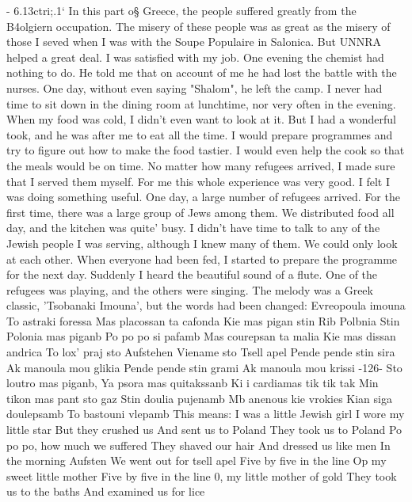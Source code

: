
- 6.13ctri;.1‘ 
In this part o§ Greece, the people suffered greatly from the B4olgiern occupation. 
The misery of these people was as great as the misery of those I seved when I was with 
the Soupe Populaire in Salonica. But UNNRA helped a great deal. I was satisfied with 
my job. 
One evening the chemist had nothing to do. He told me that on account of me 
he had lost the battle with the nurses. One day, without even saying "Shalom", he 
left the camp. 
I never had time to sit down in the dining room at lunchtime, nor very often in 
the evening. When my food was cold, I didn't even want to look at it. But I had a 
wonderful took, and he was after me to eat all the time. I would prepare programmes 
and try to figure out how to make the food tastier. I would even help the cook so 
that the meals would be on time. No matter how many refugees arrived, I made sure 
that I served them myself. For me this whole experience was very good. I felt I 
was doing something useful. 
One day, a large number of refugees arrived. For the first time, there was a 
large group of Jews among them. We distributed food all day, and the kitchen was quite' 
busy. I didn't have time to talk to any of the Jewish people I was serving, although 
I knew many of them. We could only look at each other. When everyone had been fed, 
I started to prepare the programme for the next day. Suddenly I heard the beautiful 
sound of a flute. One of the refugees was playing, and the others were singing. The 
melody was a Greek classic, 'Tsobanaki Imouna', but the words had been changed: 
Evreopoula imouna 
To astraki foressa 
Mas placossan ta cafonda 
Kie mas pigan stin Rib Polbnia 
Stin Polonia mas piganb 
Po po po si pafamb 
Mas courepsan ta malia 
Kie mas dissan andrica 
To lox' praj sto Aufstehen 
Viename sto Tsell apel 
Pende pende stin sira 
Ak manoula mou glikia 
Pende pende stin grami 
Ak manoula mou krissi 
-126- 
Sto loutro mas piganb, 
Ya psora mas quitakssanb 
Ki i cardiamas tik tik tak 
Min tikon mas pant sto gaz 
Stin doulia pujenamb 
Mb anenous kie vrokies 
Kian siga doulepsamb 
To bastouni vlepamb 
This means: 
I was a little Jewish girl 
I wore my little star 
But they crushed us 
And sent us to Poland 
They took us to Poland 
Po po po, how much we suffered 
They shaved our hair 
And dressed us like men 
In the morning Aufsten 
We went out for tsell apel 
Five by five in the line 
Op 
my sweet little mother 
Five by five in the line 
0, my little mother of gold 
They took us to the baths 
And examined us for lice 
